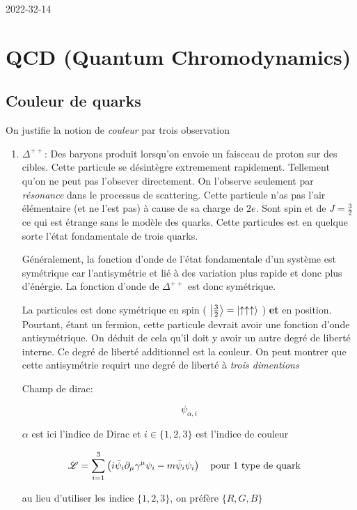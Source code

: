 


2022-32-14

\section*{QCD (Quantum Chromodynamics)}


\subsection*{Couleur de quarks}

On justifie la notion de \textit{couleur} par trois observation

\begin{enumerate}
	\item $\Delta^{++}$: Des baryons produit lorsqu'on envoie un faisceau de proton sur des cibles. Cette particule se désintègre extremement rapidement. Tellement qu'on ne peut pas l'obsever directement. On l'observe seulement par \textit{résonance} dans le processus de scattering. Cette particule n'as pas l'air élémentaire (et ne l'est pas) à cause de sa charge de $2e$. Sont spin et de $J= \frac{3}{2} $ ce qui est étrange sans le modèle des quarks. Cette particules est en quelque sorte l'état fondamentale de trois quarks.    

Généralement, la fonction d'onde de l'état fondamentale d'un système est symétrique car l'antisymétrie et lié à des variation plus rapide et donc plus d'énérgie. La fonction d'onde de $\Delta^{++}$ est donc symétrique.  

La particules est donc symétrique en spin ( $\ket{\frac{3}{2} } = \ket{\uparrow\uparrow\uparrow}$  ) \textbf{et} en position. Pourtant, étant un fermion, cette particule devrait avoir une fonction d'onde antisymétrique. On déduit de cela qu'il doit y avoir un autre degré de liberté interne. Ce degré de liberté additionnel est la couleur. On peut montrer que cette antisymétrie requirt une degré de liberté à \textit{trois dimentions}

Champ de dirac:

\[ \psi_{\alpha,i}  \] 

$\alpha$ est ici l'indice de Dirac et $i \in \{ 1,2,3 \} $ est l'indice de couleur  

\[ \mathscr{L} = \sum_{i=1}^{3} \left( i \bar \psi_i \partial_{\mu} \gamma^{\mu}\psi_i - m \bar \psi_i \psi_i \right) \qq{pour 1 type de quark} \] 

au lieu d'utiliser les indice $\{ 1,2,3 \} $, on préfère $\{ 	R, G, B \} $ 


\end{enumerate}
